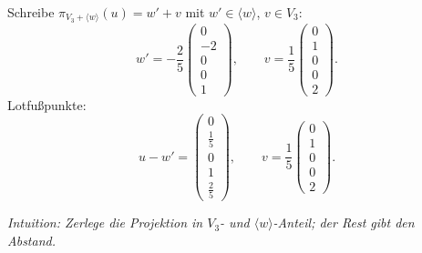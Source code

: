 \documentclass[11pt, a4paper]{article}
\begin{document}
\begin{enumerate}
\begin{framed}
  Schreibe $\pi_{V_3+\langle w\rangle}(u)=w'+v$ mit $w'\in\langle w\rangle$, $v\in V_3$:
  \[
  w'=-\frac{2}{5}\begin{pmatrix}0\\-2\\0\\0\\1\end{pmatrix},\qquad
  v=\frac{1}{5}\begin{pmatrix}0\\1\\0\\0\\2\end{pmatrix}.
  \]
  Lotfußpunkte:
  \[
  u-w'=\begin{pmatrix}0\\\tfrac{1}{5}\\0\\1\\\tfrac{2}{5}\end{pmatrix},
  \qquad 
  v=\frac{1}{5}\begin{pmatrix}0\\1\\0\\0\\2\end{pmatrix}.
  \]

  \medskip\noindent\textit{Intuition: Zerlege die Projektion in $V_3$- und $\langle w\rangle$-Anteil; der Rest gibt den Abstand.}
  \end{framed}
\end{enumerate}
\end{document}
